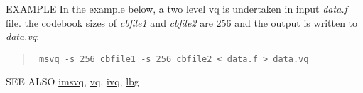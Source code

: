 \begin{options}
\end{options}

\begin{qsection}{EXAMPLE}
In the example below, a two level vq is undertaken in input {\em data.f}
file. the codebook sizes of 
{\em cbfile1} and {\em cbfile2} are 256 and the output is written
to {\em data.vq}:
\begin{quote}
\verb! msvq -s 256 cbfile1 -s 256 cbfile2 < data.f > data.vq!
\end{quote} 
\end{qsection}

\begin{qsection}{SEE ALSO}
\hyperlink{imsvq}{imsvq},
\hyperlink{vq}{vq},
\hyperlink{ivq}{ivq},
\hyperlink{lbg}{lbg}
\end{qsection}
